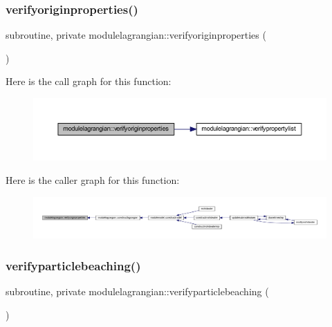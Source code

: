 \subsubsection{\texorpdfstring{verifyoriginproperties()}{verifyoriginproperties()}}
{\footnotesize\ttfamily subroutine, private modulelagrangian\+::verifyoriginproperties (\begin{DoxyParamCaption}{ }\end{DoxyParamCaption})\hspace{0.3cm}{\ttfamily [private]}}

Here is the call graph for this function\+:\nopagebreak
\begin{figure}[H]
\begin{center}
\leavevmode
\includegraphics[width=350pt]{namespacemodulelagrangian_a3afb63d9461c6e731400252243804a3b_cgraph}
\end{center}
\end{figure}
Here is the caller graph for this function\+:\nopagebreak
\begin{figure}[H]
\begin{center}
\leavevmode
\includegraphics[width=350pt]{namespacemodulelagrangian_a3afb63d9461c6e731400252243804a3b_icgraph}
\end{center}
\end{figure}
\mbox{\label{namespacemodulelagrangian_abaac5c633b5d8d05a11c32bbee80acaa}} 
\subsubsection{\texorpdfstring{verifyparticlebeaching()}{verifyparticlebeaching()}}
{\footnotesize\ttfamily subroutine, private modulelagrangian\+::verifyparticlebeaching (\begin{DoxyParamCaption}{ }\end{DoxyParamCaption})\hspace{0.3cm}{\ttfamily [private]}}

